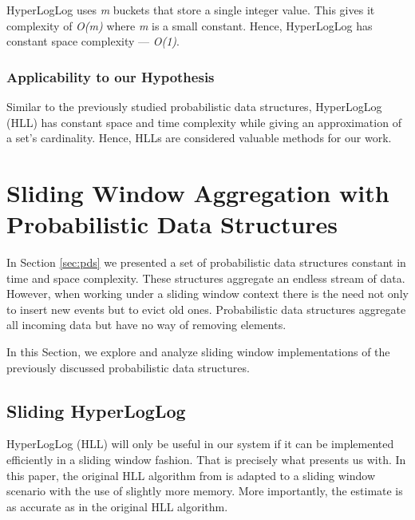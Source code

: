 HyperLogLog uses \textit{m} buckets that store a single integer value. This gives it complexity of \textit{O(m)} where \textit{m} is a small constant. Hence, HyperLogLog has constant space complexity --- \textit{O(1)}.

\subsubsection*{Applicability to our Hypothesis}
Similar to the previously studied probabilistic data structures, HyperLogLog (HLL) has constant space and time complexity while giving an approximation of a set's cardinality. Hence, HLLs are considered valuable methods for our work.



\iffalse
\section{Sliding Window Aggregation with Probabilistic Data Structures}
In Section \ref{sec:pds} we presented a set of probabilistic data structures constant in time and space complexity. These structures aggregate an endless stream of data. However, when working under a sliding window context there is the need not only to insert new events but to evict old ones. Probabilistic data structures aggregate all incoming data but have no way of removing elements. 

In this Section, we explore and analyze sliding window implementations of the previously discussed probabilistic data structures.

\subsection{Sliding HyperLogLog}
HyperLogLog  (HLL) will only be useful in our system if it can be implemented efficiently in a sliding window fashion. That is precisely what \cite{Chabchoub-Sliding-HLL} presents us with. In this paper, the original HLL algorithm from \cite{Flajolet-HLL} is adapted to a sliding window scenario with the use of slightly more memory. More importantly, the estimate is as accurate as in the original HLL algorithm. 

